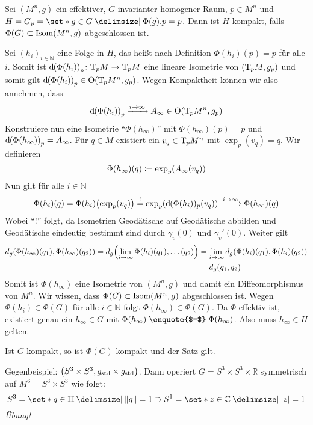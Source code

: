 \begin{lemma}
	Sei $(M^n,g)$ ein effektiver, $G$-invarianter homogener Raum, $p \in M^n$ und $H = G_p = \set*{g \in G \given \Phi(g) .p = p}$.
	Dann ist $H$ kompakt, falls $\Phi(G) \subset \Isom(M^n,g)$ abgeschlossen ist.
\end{lemma}
\begin{beweis}
	Sei $(h_i)_{i \in \mathbb{N}}$ eine Folge in $H$, das heißt nach Definition $\Phi(h_i)(p)=p$ für alle $i$.
	Somit ist $\mathd \enbrace*{\Phi(h_i)}_p \colon \Tmap_p M \to \Tmap_p M$ eine lineare Isometrie von $(\Tmap_p M, g_p)$ und somit gilt $\mathd  \enbrace*{\Phi(h_i)}_p \in \On \enbrace*{\Tmap_p M^n,g_p}$.
	Wegen Kompaktheit können wir also annehmen, dass 
	\[
		\mathd \enbrace*{\Phi(h_i)}_p \grenzw{i \to \infty} A_\infty \in \On \enbrace*{\Tmap_p M^n,g_p}
	\]
	Konstruiere nun eine Isometrie \enquote{$\Phi(h_\infty)$} mit $\Phi(h_\infty)(p)=p$ und $\mathd \enbrace*{\Phi(h_\infty)}_p = A_\infty$.
	Für $q \in M$ existiert ein $v_q \in \Tmap_p M^n$ mit $\exp_p(v_q) =q$.
	Wir definieren
	\[
		\Phi(h_\infty)(q) \coloneqq \exp_p \enbrace*{A_\infty(v_q)}
	\]
	Nun gilt für alle $i \in \mathbb{N}$ 
	\[
		\Phi(h_i)(q) = \Phi(h_i) \enbrace*{\exp_p(v_q)} \stackrel{!}{=} \exp_p \enbrace*{\mathd (\Phi(h_i))_p (v_q)} \grenzw{i \to \infty} \Phi(h_\infty)(q)
	\]
	Wobei \enquote{!} folgt, da Isometrien Geodätische auf Geodätische abbilden und Geodätische eindeutig bestimmt  sind durch $\gamma_v(0)$ und $\gamma_v'(0)$.
	Weiter gilt
	\begin{align}
		d_g \enbrace*{\Phi(h_\infty)(q_1), \Phi(h_\infty)(q_2)} = d_g \enbrace*{\lim_{i \to \infty} \Phi(h_i)(q_1), \ldots (q_2)} &= \lim_{i \to \infty} d_g \enbrace*{\Phi(h_i)(q_1), \Phi(h_i)(q_2)} \\
		&\equiv d_g(q_1,q_2)
	\end{align}
	Somit ist $\Phi(h_\infty)$ eine Isometrie von $(M^n,g)$ und damit ein Diffeomorphismus von $M^n$.
	Wir wissen, dass $\Phi(G) \subset \Isom(M^n,g)$ abgeschlossen ist.
	Wegen $\Phi(h_i) \in \Phi(G)$ für alle $i \in \mathbb{N}$ folgt $\Phi(h_\infty) \in \Phi(G)$.
	Da $\Phi$ effektiv ist, existiert genau ein $h_\infty \in G$ mit $\Phi(h_\infty) \mathrel{\text{\enquote{$=$}}} \Phi(h_\infty)$.
	Also muss $h_\infty \in H$ gelten.
\end{beweis}

\begin{beispiel*}
	Ist $G$ kompakt, so ist $\Phi(G)$ kompakt und der Satz gilt.
	
	Gegenbeispiel: $\enbrace*{S^3 \times S^3, g_{\mathrm{std}} \times g_{\mathrm{std}}}$. Dann operiert $G = S^3 \times S^3 \times \mathbb{R}$ symmetrisch auf $M^6=S^3 \times S^3$ wie folgt: 
	\[
		S^3 = \set*{q \in \mathbb{H} \given \norm*{q}=1} \supset S^1 = \set*{z \in \mathbb{C} \given \abs*{z}=1 }
	\]
	\emph{Übung!}
\end{beispiel*}

